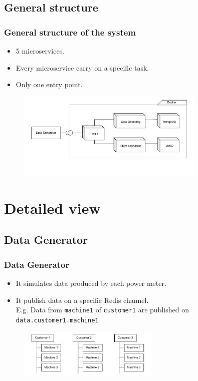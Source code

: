 \subsection{General structure}
\begin{frame}
	\frametitle{General structure of the system}
	
	\begin{itemize}
		\item 5 microservices.
		\item Every microservice carry on a specific task.
		\item Only one entry point.
	\end{itemize}
	
	\begin{figure}[h]
		\centering
		\includegraphics[width=0.8\textwidth]{./drawings/general_scheme.pdf}
	\end{figure}
\end{frame}


\section{Detailed view}

\subsection{Data Generator}
\begin{frame}
	\frametitle{Data Generator}
	
	\begin{itemize}
		\item It simulates data produced by each power meter.
		\item It publish data on a specific Redis channel.\\
			E.g. Data from \texttt{machine1} of \texttt{customer1} are published on \texttt{data.customer1.machine1}
	\end{itemize}
	
	\bigskip
	\begin{figure}[h]
		\centering
		\includegraphics[width=0.6\textwidth]{./drawings/MachinesHierarchy.pdf}
	\end{figure}
\end{frame}


